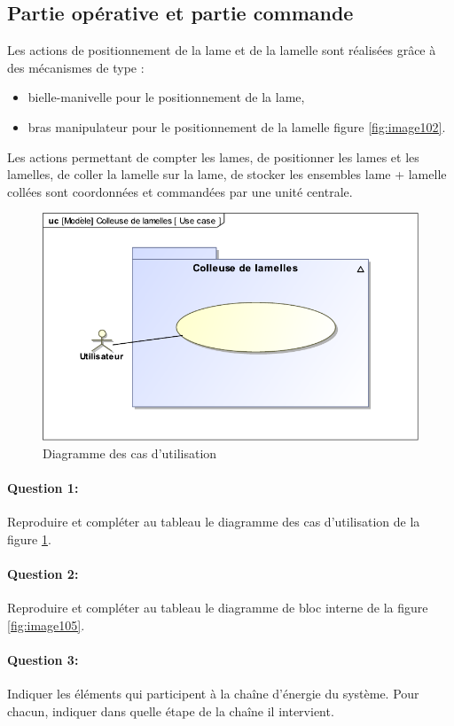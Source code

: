 \subsection{Partie opérative et partie commande}

Les actions de positionnement de la lame et de la lamelle sont réalisées grâce à des mécanismes de type :
\begin{itemize}
 \item \og bielle-manivelle \fg pour le positionnement de la lame,
 \item \og bras manipulateur \fg pour le positionnement de la lamelle figure \ref{fig:image102}.
\end{itemize}

Les actions permettant de compter les lames, de positionner les lames et les lamelles, de coller la lamelle sur la lame, de stocker les ensembles \og lame + lamelle collées \fg sont coordonnées et commandées par une unité centrale.

\begin{figure}[htbp]
\begin{center}
\includegraphics[width=0.5\linewidth]{img/colleuse_UC}
\caption{Diagramme des cas d'utilisation}
\label{fig:image104}
\end{center}
\end{figure}

\paragraph{Question 1:}
Reproduire et compléter au tableau le diagramme des cas d'utilisation de la figure \ref{fig:image104}.

\paragraph{Question 2:}
Reproduire et compléter au tableau le diagramme de bloc interne de la figure \ref{fig:image105}.

\paragraph{Question 3:}
Indiquer les éléments qui participent à la chaîne d'énergie du système. Pour chacun, indiquer dans quelle étape de la chaîne il intervient.

